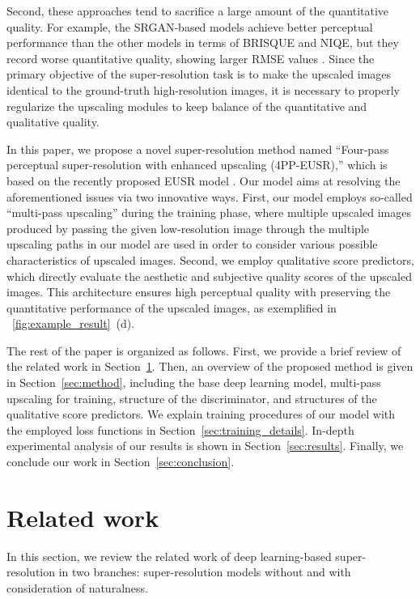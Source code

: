 \documentclass[runningheads]{llncs}
\begin{document}
Second, these approaches tend to sacrifice a large amount of the quantitative quality.
For example, the SRGAN-based models achieve better perceptual performance than the other models in terms of BRISQUE and NIQE, but they record worse quantitative quality, showing larger RMSE values \cite{blau2017perception}.
Since the primary objective of the super-resolution task is to make the upscaled images identical to the ground-truth high-resolution images, it is necessary to properly regularize the upscaling modules to keep balance of the quantitative and qualitative quality.

In this paper, we propose a novel super-resolution method named ``Four-pass perceptual super-resolution with enhanced upscaling (4PP-EUSR),'' which is based on the recently proposed EUSR model \cite{kim2018deep}.
Our model aims at resolving the aforementioned issues via two innovative ways.
First, our model employs so-called ``multi-pass upscaling'' during the training phase, where multiple upscaled images produced by passing the given low-resolution image through the multiple upscaling paths in our model are used in order to consider various possible characteristics of upscaled images.
Second, we employ qualitative score predictors, which directly evaluate the aesthetic and subjective quality scores of the upscaled images.
This architecture ensures high perceptual quality with preserving the quantitative performance of the upscaled images, as exemplified in \figurename~\ref{fig:example_result}~(d).

The rest of the paper is organized as follows.
First, we provide a brief review of the related work in Section~\ref{sec:related_work}.
Then, an overview of the proposed method is given in Section~\ref{sec:method}, including the base deep learning model, multi-pass upscaling for training, structure of the discriminator, and structures of the qualitative score predictors.
We explain training procedures of our model with the employed loss functions in Section~\ref{sec:training_details}.
In-depth experimental analysis of our results is shown in Section~\ref{sec:results}.
Finally, we conclude our work in Section~\ref{sec:conclusion}.


\section{Related work}
\label{sec:related_work}

In this section, we review the related work of deep learning-based super-resolution in two branches: super-resolution models without and with consideration of naturalness.
\end{document}
